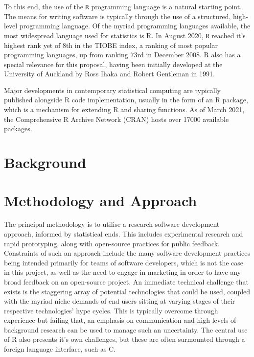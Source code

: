 \documentclass[a4paper,10pt]{article}
\begin{document}
To this end, the use of the \texttt{R} programming language is a natural starting point.
The means for writing software is typically through the use of a structured, high-level programming language.
Of the myriad programming languages available, the most widespread language used for statistics is R.
In August 2020, \texttt{R} reached it's highest rank yet of 8th in the TIOBE index, a ranking of most popular programming languages, up from ranking 73rd in December 2008\cite{tiobe2021r}.
R also has a special relevance for this proposal, having been initially developed at the University of Auckland by Ross Ihaka and Robert Gentleman in 1991\cite{ihaka1996r}.

Major developments in contemporary statistical computing are typically published alongside R code implementation, usually in the form of an R package, which is a mechanism for extending R and sharing functions.
As of March 2021, the Comprehensive R Archive Network (CRAN) hosts over 17000 available packages\cite{team20:_r}.


\section{Background}\label{background}



\section{Methodology and Approach}

The principal methodology is to utilise a research software development approach, informed by statistical ends.
This includes experimental research and rapid prototyping, along with open-source practices for public feedback.
Constraints of such an approach include the many software development practices being intended primarily for teams of software developers, which is not the case in this project, as well as the need to engage in marketing in order to have any broad feedback on an open-source project.
An immediate technical challenge that exists is the staggering array of potential technologies that could be used, coupled with the myriad niche demands of end users sitting at varying stages of their respective technologies' hype cycles.
This is typically overcome through experience but failing that, an emphasis on communication and high levels of background research can be used to manage such an uncertainty.
The central use of R also presents it's own challenges, but these are often surmounted through a foreign language interface, such as C.
\end{document}
